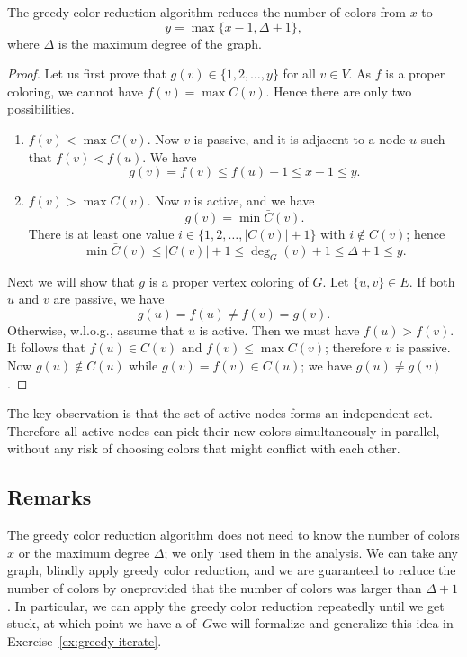 \begin{lemma}
    The greedy color reduction algorithm reduces the number of colors from $x$ to
    \[
        y = \max \{ x-1, \Delta+1 \},
    \]
    where $\Delta$ is the maximum degree of the graph.
\end{lemma}
\begin{proof}
    Let us first prove that $g(v) \in \{1,2,\dotsc,y\}$ for all $v \in V$. As $f$ is a proper coloring, we cannot have $f(v) = \max C(v)$. Hence there are only two possibilities.
    \begin{enumerate}
        \item $f(v) < \max C(v)$. Now $v$ is passive, and it is adjacent to a node $u$ such that $f(v) < f(u)$. We have
        \[
            g(v) = f(v) \le f(u) - 1 \le x - 1 \le y.
        \]
        \item $f(v) > \max C(v)$. Now $v$ is active, and we have
        \[
            g(v) = \min \bar{C}(v).
        \]
        There is at least one value $i \in \{1,2,\dotsc,|C(v)|+1\}$ with $i \notin C(v)$; hence
        \[
            \min \bar{C}(v) \le |C(v)| + 1 \le \deg_G(v) + 1 \le \Delta + 1 \le y.
        \]
    \end{enumerate}
    
    Next we will show that $g$ is a proper vertex coloring of $G$. Let $\{u,v\} \in E$. If both $u$ and $v$ are passive, we have
    \[
        g(u) = f(u) \ne f(v) = g(v).
    \]
    Otherwise, w.l.o.g., assume that $u$ is active. Then we must have $f(u) > f(v)$. It follows that $f(u) \in C(v)$ and $f(v) \le \max C(v)$; therefore $v$ is passive. Now
    $g(u) \notin C(u)$ while
    $g(v) = f(v) \in C(u)$; we have $g(u) \ne g(v)$.
\end{proof}

The key observation is that the set of active nodes forms an independent set. Therefore all active nodes can pick their new colors simultaneously in parallel, without any risk of choosing colors that might conflict with each other.

\subsection{Remarks}

The greedy color reduction algorithm does not need to know the number of colors $x$ or the maximum degree $\Delta$; we only used them in the analysis. We can take any graph, blindly apply greedy color reduction, and we are guaranteed to reduce the number of colors by one\mydash provided that the number of colors was larger than $\Delta + 1$. In particular, we can apply the greedy color reduction repeatedly until we get stuck, at which point we have a \Dpocol{} of~$G$\mydash we will formalize and generalize this idea in Exercise~\ref{ex:greedy-iterate}.

